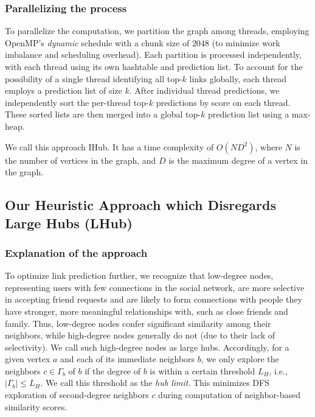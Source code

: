 \subsubsection{Parallelizing the process}

To parallelize the computation, we partition the graph among threads, employing OpenMP's \textit{dynamic} schedule with a chunk size of $2048$ (to minimize work imbalance and scheduling overhead). Each partition is processed independently, with each thread using its own hashtable and prediction list. To account for the possibility of a single thread identifying all top-$k$ links globally, each thread employs a prediction list of size $k$. After individual thread predictions, we independently sort the per-thread top-$k$ predictions by score on each thread. These sorted lists are then merged into a global top-$k$ prediction list using a max-heap.


We call this approach IHub. It has a time complexity of $O(ND^2)$, where $N$ is the number of vertices in the graph, and $D$ is the maximum degree of a vertex in the graph.




\subsection{Our Heuristic Approach which Disregards Large Hubs (LHub)}

\subsubsection{Explanation of the approach}

To optimize link prediction further, we recognize that low-degree nodes, representing users with few connections in the social network, are more selective in accepting friend requests and are likely to form connections with people they have stronger, more meaningful relationships with, such as close friends and family. Thus, low-degree nodes confer significant similarity among their neighbors, while high-degree nodes generally do not (due to their lack of selectivity). We call such high-degree nodes as large hubs. Accordingly, for a given vertex $a$ and each of its immediate neighbors $b$, we only explore the neighbors $c \in \Gamma_b$ of $b$ if the degree of $b$ is within a certain threshold $L_H$, i.e., $|\Gamma_b| \leq L_H$. We call this threshold as the \textit{hub limit}. This minimizes DFS exploration of second-degree neighbors $c$ during computation of neighbor-based similarity scores.

